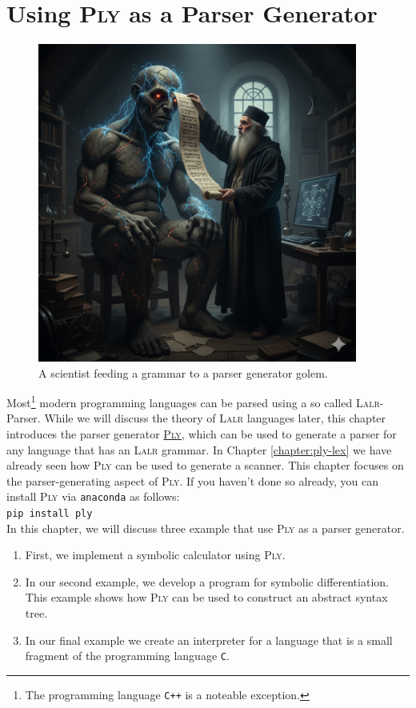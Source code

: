 \chapter{Using \textsc{Ply} as a Parser Generator  \label{chapter:ply}}

\begin{figure}[h] 
\centering
  \includegraphics[width=10.5cm]{Abbildungen/golem.png}
\caption{A scientist feeding a grammar to a parser generator golem.}
\label{fig:golem.png}
\end{figure}


Most\footnote{The programming language \texttt{C++} is a noteable exception.} modern programming languages can
be parsed using a so called \textsc{Lalr}-Parser.  While we will discuss the theory of \textsc{Lalr} languages
later, this chapter introduces the parser generator \href{https://www.dabeaz.com/ply/}{\textsc{Ply}}, which can be used to
generate a parser for any language that has an \textsc{Lalr} grammar.  In Chapter \ref{chapter:ply-lex} we have already
seen how \textsc{Ply} can be used to generate a scanner.  This chapter focuses on the parser-generating aspect
of \textsc{Ply}.   If you haven't done so already, you can install \textsc{Ply} via \texttt{anaconda} as follows:
\\[0.2cm]
\hspace*{1.3cm}
\texttt{pip install ply}
\\[0.2cm]
In this chapter, we will discuss three example that use \textsc{Ply} as a parser generator.
\begin{enumerate}
\item First, we implement a symbolic calculator using \textsc{Ply}.
\item In our second example, we develop a program for symbolic differentiation.
      This example shows how \textsc{Ply} can be used to construct an abstract syntax tree.
\item In our final example we create an interpreter for a language that is a small fragment of the
      programming language \texttt{C}.
\end{enumerate}


